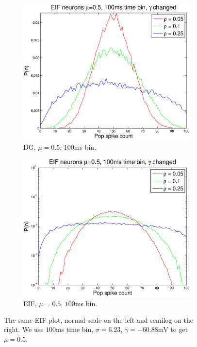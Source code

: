 \documentclass[11pt]{article}
\begin{document}
\begin{figure}[H]
	\begin{subfigure}[h]{0.5\textwidth}
	\centering
	\includegraphics[width=\textwidth]{../Figures/EIF/EIF_Macke_2a_mu_05_100ms_gamma}
	\caption{DG, $\mu = 0.5$, $100$ms bin.}
	\label{fig11}
	\end{subfigure}
	\begin{subfigure}[h]{0.5\textwidth}
	\centering
	\includegraphics[width=\textwidth]{../Figures/EIF/EIF_Macke_2a_mu_05_100ms_gamma_semilog}
	\caption{EIF, $\mu = 0.5$, $100$ms bin.}
	\label{fig12}
	\end{subfigure}
	\caption{\footnotesize The same EIF plot, normal scale on the left and semilog on the right. We use $100$ms time bin, $\sigma = 6.23$, $\gamma = -60.88$mV to get $\mu = 0.5$.}
\end{figure}
\end{document}
